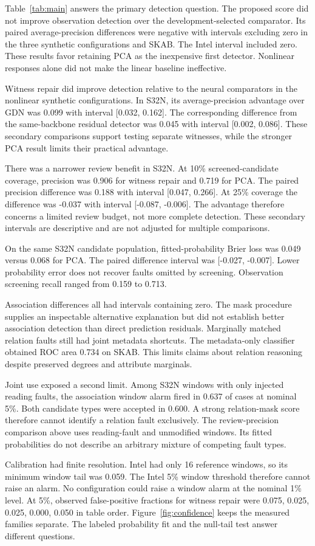 Table~\ref{tab:main} answers the primary detection question. The proposed score did not improve observation detection over the development-selected comparator. Its paired average-precision differences were negative with intervals excluding zero in the three synthetic configurations and SKAB. The Intel interval included zero. These results favor retaining PCA as the inexpensive first detector. Nonlinear responses alone did not make the linear baseline ineffective.

Witness repair did improve detection relative to the neural comparators in the nonlinear synthetic configurations. In S32N, its average-precision advantage over GDN was 0.099 with interval [0.032, 0.162]. The corresponding difference from the same-backbone residual detector was 0.045 with interval [0.002, 0.086]. These secondary comparisons support testing separate witnesses, while the stronger PCA result limits their practical advantage.

There was a narrower review benefit in S32N. At 10\% screened-candidate coverage, precision was 0.906 for witness repair and 0.719 for PCA. The paired precision difference was 0.188 with interval [0.047, 0.266]. At 25\% coverage the difference was -0.037 with interval [-0.087, -0.006]. The advantage therefore concerns a limited review budget, not more complete detection. These secondary intervals are descriptive and are not adjusted for multiple comparisons.

On the same S32N candidate population, fitted-probability Brier loss was 0.049 versus 0.068 for PCA. The paired difference interval was [-0.027, -0.007]. Lower probability error does not recover faults omitted by screening. Observation screening recall ranged from 0.159 to 0.713.

Association differences all had intervals containing zero. The mask procedure supplies an inspectable alternative explanation but did not establish better association detection than direct prediction residuals. Marginally matched relation faults still had joint metadata shortcuts. The metadata-only classifier obtained ROC area 0.734 on SKAB. This limits claims about relation reasoning despite preserved degrees and attribute marginals.

Joint use exposed a second limit. Among S32N windows with only injected reading faults, the association window alarm fired in 0.637 of cases at nominal 5\%. Both candidate types were accepted in 0.600. A strong relation-mask score therefore cannot identify a relation fault exclusively. The review-precision comparison above uses reading-fault and unmodified windows. Its fitted probabilities do not describe an arbitrary mixture of competing fault types.

Calibration had finite resolution. Intel had only 16 reference windows, so its minimum window tail was 0.059. The Intel 5\% window threshold therefore cannot raise an alarm. No configuration could raise a window alarm at the nominal 1\% level. At 5\%, observed false-positive fractions for witness repair were 0.075, 0.025, 0.025, 0.000, 0.050 in table order. Figure~\ref{fig:confidence} keeps the measured families separate. The labeled probability fit and the null-tail test answer different questions.
